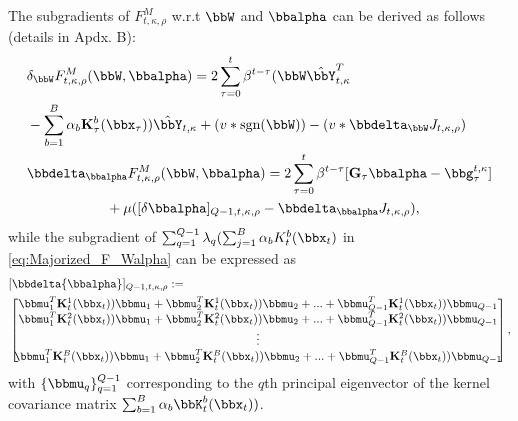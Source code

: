 \documentclass[10pt,final]{IEEEtran}
\begin{document}
The subgradients of $F_{t,\kappa,\rho}^M$ w.r.t  $\bbW$ and $\bbalpha$  can be derived as follows (details in Apdx. B):
\begin{align}\label{eq:Sub_F_t_W}
&\delta_{\bbW}F_{t,\kappa,\rho}^M(\bbW,\bbalpha) = 2\sum_{\tau=0}^{t}\beta^{t-\tau}(\bbW\hat{\bbY}_{t,\kappa}^T\nonumber\\
&-\sum_{b=1}^{B}\alpha_{b}\mathbf{K}_{\tau}^b(\bbx_{\tau}))\hat{\bbY}_{t,\kappa}
+(v*\textrm{sgn}({\bbW}))-(v*\bbdelta_{\bbW} J_{t,\kappa,
\rho})\nonumber\\
&\bbdelta_{\bbalpha}F_{t,\kappa,\rho}^M(\bbW,\bbalpha)=
2\sum_{\tau=0}^{t}\beta^{t-\tau}[\mathbf{G}_{\tau}\bbalpha-\bbg_{\tau}^{t,\kappa}]\\
&\hspace{2cm}+\mu([\delta{\bbalpha}]_{Q-1,t,\kappa,\rho}-\bbdelta_{\bbalpha} J_{t,\kappa,\rho}),\nonumber
\end{align}
while the subgradient of $\sum_{q=1}^{Q-1}\lambda_q(\sum_{j=1}^{B}\alpha_b K_{t}^b(\bbx_{t})$ in \eqref{eq:Majorized_F_Walpha} can be expressed as \cite{subgradient methods}
\begin{align}\label{eq:Subgradient_Formulas_alpha}
&[\bbdelta{\bbalpha}]_{Q-1,t,\kappa,\rho}:=\\
&\left[\hspace{-0.3cm}\begin{array}{c}
{\bbmu}_1^T\mathbf{K}_{t}^1(\bbx_{t})){\bbmu}_1+{\bbmu}_2^T\mathbf{K}_{t}^1(\bbx_{t})){\bbmu}_2+...+{\bbmu}_{Q-1}^T\mathbf{K}_{t}^1(\bbx_{t})){\bbmu}_{Q-1}\\
{\bbmu}_1^T\mathbf{K}_{t}^2(\bbx_{t})){\bbmu}_1+{\bbmu}_2^T\mathbf{K}_{t}^2(\bbx_{t})){\bbmu}_2+...+{\bbmu}_{Q-1}^T\mathbf{K}_{t}^2(\bbx_{t})){\bbmu}_{Q-1}\\
\vdots\\
{\bbmu}_1^T\mathbf{K}_{t}^B(\bbx_{t})){\bbmu}_1+{\bbmu}_2^T\mathbf{K}_{t}^B(\bbx_{t})){\bbmu}_2+...+{\bbmu}_{Q-1}^T\mathbf{K}_{t}^B(\bbx_{t})){\bbmu}_{Q-1}
\end{array}\hspace{-0.3cm}\right],\nonumber
\end{align}
with $\{\bbmu_q\}_{q=1}^{Q-1}$ corresponding to the $q$th principal eigenvector of the kernel covariance matrix $\sum_{b=1}^B\alpha_b{\bbK}_{t}^b(\bbx_{t}))$.
\end{document}
